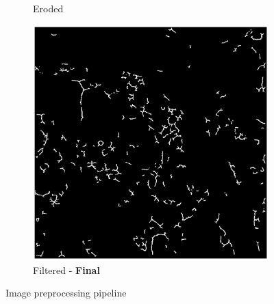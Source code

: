 \documentclass[a4paper, 11pt]{article}
\numberwithin{equation}{section}
\begin{document}
\begin{figure}[!ht]
\begin{subfigure}[t]{.3\textwidth}
				\caption{Eroded}
			\end{subfigure}
			\quad
			\begin{subfigure}[t]{.3\textwidth}
				\centering
				\includegraphics[width=\textwidth]{15_filtered}
				\caption{Filtered - \textbf{Final}}
			\end{subfigure}
			
			\caption{Image preprocessing pipeline}
			\label{fig:imagepreprocessing}
		\end{figure}
		
\end{document}
